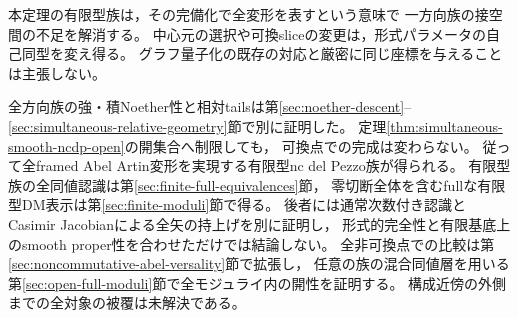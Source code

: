 \begin{remark}[有限型族の形式的完全性とatlas]
本定理の有限型族は，その完備化で全変形を表すという意味で
一方向族の接空間の不足を解消する。
中心元の選択や可換sliceの変更は，形式パラメータの自己同型を変え得る。
グラフ量子化の既存の対応と厳密に同じ座標を与えることは主張しない。

全方向族の強・積Noether性と相対tailsは第\ref{sec:noether-descent}--
\ref{sec:simultaneous-relative-geometry}節で別に証明した。
定理\ref{thm:simultaneous-smooth-ncdp-open}の開集合へ制限しても，
可換点での完成は変わらない。
従って全framed Abel Artin変形を実現する有限型nc del Pezzo族が得られる。
有限型族の全同値認識は第\ref{sec:finite-full-equivalences}節，
零切断全体を含むfullな有限型DM表示は第\ref{sec:finite-moduli}節で得る。
後者には通常次数付き認識とCasimir Jacobianによる全矢の持上げを別に証明し，
形式的完全性と有限基底上のsmooth proper性を合わせただけでは結論しない。
全非可換点での比較は第\ref{sec:noncommutative-abel-versality}節で拡張し，
任意の族の混合同値層を用いる第\ref{sec:open-full-moduli}節で全モジュライ内の開性を証明する。
構成近傍の外側までの全対象の被覆は未解決である。
\end{remark}
